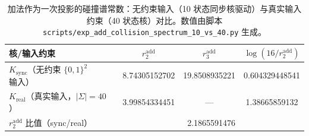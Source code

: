 \begin{table}[H]
\centering
\small
\setlength{\tabcolsep}{6pt}
\renewcommand{\arraystretch}{1.15}
\caption{加法作为一次投影的碰撞谱常数：无约束输入（10 状态同步核驱动）与真实输入约束（40 状态核）对比。数值由脚本 \texttt{scripts/exp\_add\_collision\_spectrum\_10\_vs\_40.py} 生成。}
\label{tab:add-collision-spectrum-10-vs-40}
\begin{tabular}{@{}lccc@{}}
\toprule
核/输入约束 & $r^{\mathrm{add}}_2$ & $r^{\mathrm{add}}_3$ & $\log(16/r^{\mathrm{add}}_2)$ \\
\midrule
$K_{\mathrm{sync}}$（无约束 $\{0,1\}^2$ 输入） & 8.74305152702 & 19.8508935221 & 0.604329448541 \\
$K_{\mathrm{real}}$（真实输入，$|\Sigma|=40$） & 3.99854334451 & --- & 1.38665859132 \\
\midrule
$r^{\mathrm{add}}_2$ 比值（sync/real） & \multicolumn{3}{c}{2.1865591476} \\
\bottomrule
\end{tabular}
\end{table}
